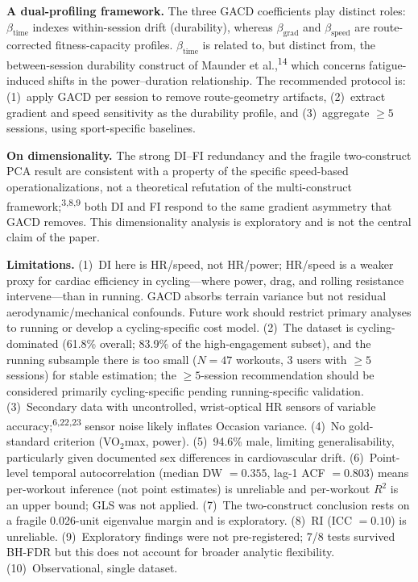 \documentclass[12pt]{article}
\begin{document}
\textbf{A dual-profiling framework.} The three GACD coefficients play
distinct roles: $\beta_{\mathrm{time}}$ indexes within-session drift
(durability), whereas $\beta_{\mathrm{grad}}$ and $\beta_{\mathrm{speed}}$
are route-corrected fitness-capacity profiles. $\beta_{\mathrm{time}}$ is
related to, but distinct from, the between-session durability construct of
Maunder et al.,\textsuperscript{14} which concerns fatigue-induced shifts
in the power--duration relationship. The recommended protocol is:
(1)~apply GACD per session to remove route-geometry artifacts,
(2)~extract gradient and speed sensitivity as the durability profile, and
(3)~aggregate $\geq 5$ sessions, using sport-specific baselines.

\textbf{On dimensionality.} The strong DI--FI redundancy and the fragile
two-construct PCA result are consistent with a property of the specific
speed-based operationalizations, not a theoretical refutation of the
multi-construct framework;\textsuperscript{3,8,9} both DI and FI respond
to the same gradient asymmetry that GACD removes. This dimensionality
analysis is exploratory and is not the central claim of the paper.

\textbf{Limitations.} (1)~DI here is HR/speed, not HR/power; HR/speed is a
weaker proxy for cardiac efficiency in cycling---where power, drag, and
rolling resistance intervene---than in running. GACD absorbs terrain
variance but not residual aerodynamic/mechanical confounds. Future work
should restrict primary analyses to running or develop a cycling-specific
cost model. (2)~The dataset is cycling-dominated (61.8\% overall; 83.9\% of
the high-engagement subset), and the running subsample there is too small
($N = 47$ workouts, 3 users with $\geq 5$ sessions) for stable estimation;
the $\geq 5$-session recommendation should be considered primarily
cycling-specific pending running-specific validation. (3)~Secondary data
with uncontrolled, wrist-optical HR sensors of variable
accuracy;\textsuperscript{6,22,23} sensor noise likely inflates Occasion
variance. (4)~No gold-standard criterion (VO$_2$max, power). (5)~94.6\%
male, limiting generalisability, particularly given documented sex
differences in cardiovascular drift. (6)~Point-level temporal
autocorrelation (median DW $= 0.355$, lag-1 ACF $= 0.803$) means
per-workout inference (not point estimates) is unreliable and per-workout
$R^2$ is an upper bound; GLS was not applied. (7)~The two-construct
conclusion rests on a fragile 0.026-unit eigenvalue margin and is
exploratory. (8)~RI (ICC $= 0.10$) is unreliable. (9)~Exploratory findings
were not pre-registered; 7/8 tests survived BH-FDR but this does not
account for broader analytic flexibility. (10)~Observational, single
dataset.
\end{document}
